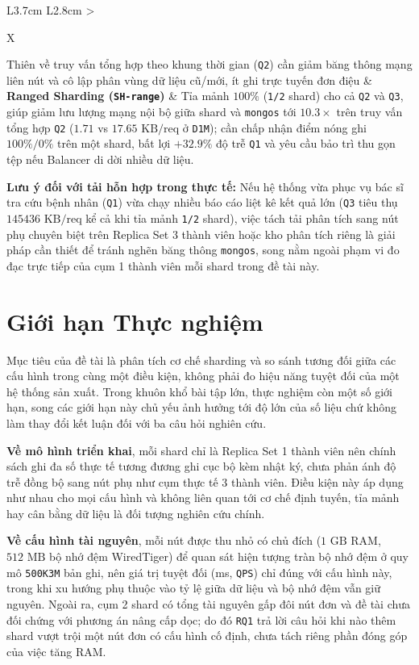 \begin{table}[!htb]
\begin{tabularx}{\linewidth}{L{3.7cm} L{2.8cm} >{\raggedright\arraybackslash}X}
\midrule
Thiên về truy vấn tổng hợp theo khung thời gian (\texttt{Q2}) cần giảm băng thông mạng liên nút và cô lập phân vùng dữ liệu cũ/mới, ít ghi trực tuyến đơn điệu & \textbf{Ranged Sharding (\texttt{SH-range})} & Tỉa mảnh $100\%$ (\texttt{1/2} shard) cho cả \texttt{Q2} và \texttt{Q3}, giúp giảm lưu lượng mạng nội bộ giữa shard và \texttt{mongos} tới \textbf{$10.3\times$} trên truy vấn tổng hợp \texttt{Q2} ($1.71$ vs $17.65\text{ KB/req}$ ở \texttt{D1M}); cần chấp nhận điểm nóng ghi $100\%/0\%$ trên một shard, bất lợi $+32.9\%$ độ trễ \texttt{Q1} và yêu cầu bảo trì thu gọn tệp nếu Balancer di dời nhiều dữ liệu. \\
\bottomrule
\end{tabularx}
\end{table}

\textbf{Lưu ý đối với tải hỗn hợp trong thực tế:} Nếu hệ thống vừa phục vụ bác sĩ tra cứu bệnh nhân (\texttt{Q1}) vừa chạy nhiều báo cáo liệt kê kết quả lớn (\texttt{Q3} tiêu thụ $145$\textendash $436\text{ KB/req}$ kể cả khi tỉa mảnh \texttt{1/2} shard), việc tách tải phân tích sang nút phụ chuyên biệt trên Replica Set 3 thành viên hoặc kho phân tích riêng là giải pháp cần thiết để tránh nghẽn băng thông \texttt{mongos}, song nằm ngoài phạm vi đo đạc trực tiếp của cụm 1 thành viên mỗi shard trong đề tài này.

\section{Giới hạn Thực nghiệm}

Mục tiêu của đề tài là phân tích cơ chế sharding và so sánh tương đối giữa các cấu hình trong cùng một điều kiện, không phải đo hiệu năng tuyệt đối của một hệ thống sản xuất. Trong khuôn khổ bài tập lớn, thực nghiệm còn một số giới hạn, song các giới hạn này chủ yếu ảnh hưởng tới độ lớn của số liệu chứ không làm thay đổi kết luận đối với ba câu hỏi nghiên cứu.

\textbf{Về mô hình triển khai}, mỗi shard chỉ là Replica Set 1 thành viên nên chính sách ghi đa số thực tế tương đương ghi cục bộ kèm nhật ký, chưa phản ánh độ trễ đồng bộ sang nút phụ như cụm thực tế 3 thành viên. Điều kiện này áp dụng như nhau cho mọi cấu hình và không liên quan tới cơ chế định tuyến, tỉa mảnh hay cân bằng dữ liệu là đối tượng nghiên cứu chính.

\textbf{Về cấu hình tài nguyên}, mỗi nút được thu nhỏ có chủ đích ($1\text{ GB}$ RAM, $512\text{ MB}$ bộ nhớ đệm WiredTiger) để quan sát hiện tượng tràn bộ nhớ đệm ở quy mô \texttt{500K}\textendash \texttt{3M} bản ghi, nên giá trị tuyệt đối (ms, \texttt{QPS}) chỉ đúng với cấu hình này, trong khi xu hướng phụ thuộc vào tỷ lệ giữa dữ liệu và bộ nhớ đệm vẫn giữ nguyên. Ngoài ra, cụm 2 shard có tổng tài nguyên gấp đôi nút đơn và đề tài chưa đối chứng với phương án nâng cấp dọc; do đó \texttt{RQ1} trả lời câu hỏi khi nào thêm shard vượt trội một nút đơn có cấu hình cố định, chưa tách riêng phần đóng góp của việc tăng RAM.

